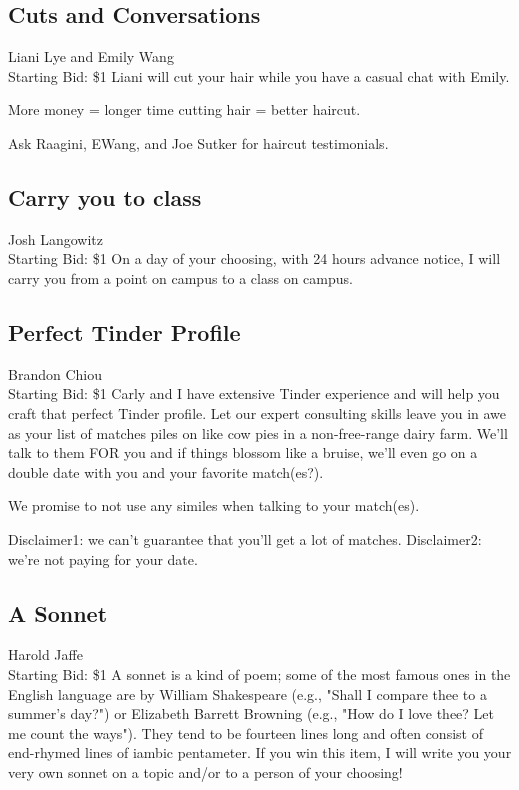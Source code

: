 \documentclass[11pt]{article}
\begin{document}
\subsection{Cuts and Conversations}
Liani Lye and Emily Wang
\\
Starting Bid: \$1
\newline
Liani will cut your hair while you have a casual chat with Emily.

More money = longer time cutting hair = better haircut.

Ask Raagini, EWang, and Joe Sutker for haircut testimonials.
\subsection{Carry you to class}
Josh Langowitz
\\
Starting Bid: \$1
\newline
On a day of your choosing, with 24 hours advance notice, I will carry you from a point on campus to a class on campus.
\subsection{Perfect Tinder Profile}
Brandon Chiou
\\
Starting Bid: \$1
\newline
Carly and I have extensive Tinder experience and will help you craft that perfect Tinder profile. Let our expert consulting skills leave you in awe as your list of matches piles on like cow pies in a non-free-range dairy farm. We'll talk to them FOR you and if things blossom like a bruise, we'll even go on a double date with you and your favorite match(es?).

We promise to not use any similes when talking to your match(es). 

Disclaimer1: we can't guarantee that you'll get a lot of matches.
Disclaimer2: we're not paying for your date.
\subsection{A Sonnet}
Harold Jaffe
\\
Starting Bid: \$1
\newline
A sonnet is a kind of poem; some of the most famous ones in the English language are by William Shakespeare (e.g., "Shall I compare thee to a summer's day?") or Elizabeth Barrett Browning (e.g., "How do I love thee? Let me count the ways"). They tend to be fourteen lines long and often consist of end-rhymed lines of iambic pentameter. If you win this item, I will write you your very own sonnet on a topic and/or to a person of your choosing!
\end{document}
